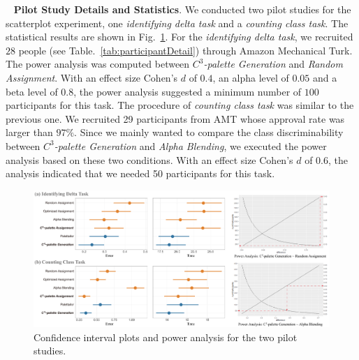 \documentclass[review,onecolumn]{vgtc}                %
\newcommand{\myparagraph}[1]{\mbox{\ } \newline \noindent \textbf{#1}}
\renewcommand{\paragraph}[1]{\myparagraph{#1}}
\begin{document}
\paragraph{Pilot Study Details and Statistics}.
We conducted two pilot studies for the scatterplot experiment, one \emph{identifying delta task} and a \emph{counting class task}. The statistical results are shown in Fig.~\ref{fig:pilotResults}.
For the \emph{identifying delta task}, we recruited $28$ people (see Table.~\ref{tab:participantDetail}) through Amazon Mechanical Turk. The power analysis was computed between \emph{$C^3$-palette Generation} and \emph{Random Assignment}. With an effect size Cohen's $d$ of $0.4$, an alpha level of $0.05$ and a beta level of $0.8$, the power analysis suggested a minimum number of $100$ participants for this task.
The procedure of \emph{counting class task} was similar to the previous one. We recruited 29 participants from AMT whose approval rate was larger than $97\%$. Since we mainly wanted to compare the class discriminability between \emph{$C^3$-palette Generation} and \emph{Alpha Blending}, we executed the power analysis based on these two conditions.  With an effect size Cohen's $d$ of $0.6$, the analysis indicated that we needed 50 participants for this task.

\begin{figure}[h]
\centering
\includegraphics[width=1\linewidth]{user-result-pilot.pdf}
\caption{Confidence interval plots and power analysis for the two pilot studies.}
\vspace*{-5mm}
\label{fig:pilotResults}
\end{figure}
\end{document}
